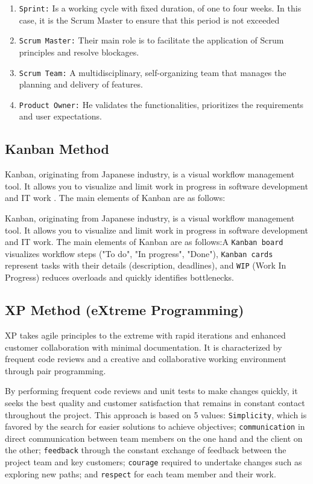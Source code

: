 \begin{enumerate}[label=\textbf{-}]
    \item \texttt{Sprint:} Is a working cycle with fixed duration, of one to four weeks. In this case, it is the Scrum Master to ensure that this period is not exceeded \cite{schwaber2004agile}

    \item \texttt{Scrum Master:} Their main role is to facilitate the application of Scrum principles and resolve blockages.

    \item \texttt{Scrum Team:} A multidisciplinary, self-organizing team that manages the planning and delivery of features.


    \item \texttt{Product Owner:} He validates the functionalities, prioritizes the requirements and user expectations.

    
\end{enumerate}
\subsection{Kanban Method}
Kanban, originating from Japanese industry, is a visual workflow management tool. It allows you to visualize and limit work in progress in software development and IT work . The main elements of Kanban are as follows:

Kanban, originating from Japanese industry, is a visual workflow management tool. It allows you to visualize and limit work in progress in software development and IT work\cite{anderson2010kanban}. The main elements of Kanban are as follows:A \texttt{Kanban board} visualizes workflow steps ("To do", "In progress", "Done"), \texttt{Kanban cards} represent tasks with their details (description, deadlines), and \texttt{WIP} (Work In Progress) reduces overloads and quickly identifies bottlenecks.

\subsection{XP Method (eXtreme Programming)}

XP takes agile principles to the extreme with rapid iterations and enhanced customer collaboration with minimal documentation. It is characterized by frequent code reviews and a creative and collaborative working environment through pair programming\cite{beck2000extreme}. 


By performing frequent code reviews and unit tests to make changes quickly, it seeks the best quality and customer satisfaction that remains in constant contact throughout the project. This approach is based on 5 values: \texttt{Simplicity}, which is favored by the search for easier solutions to achieve objectives; \texttt{communication} in direct communication between team members on the one hand and the client on the other; \texttt{feedback} through the constant exchange of feedback between the project team and key customers; \texttt{courage} required to undertake changes such as exploring new paths; and \texttt{respect} for each team member and their work.


